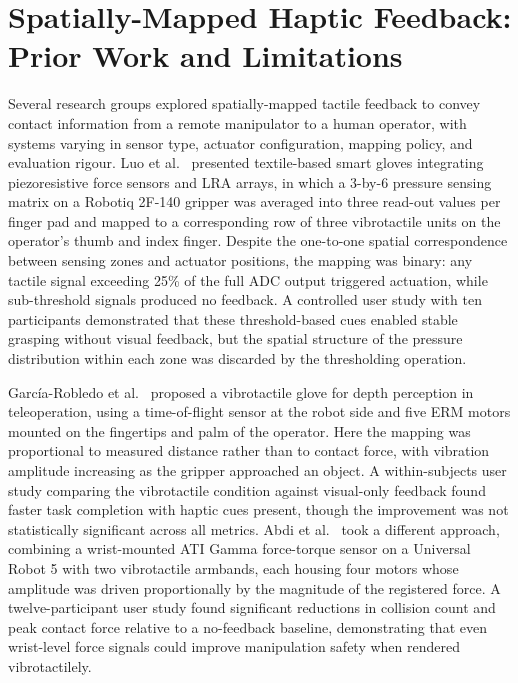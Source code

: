 \documentclass[12pt, a4paper]{report}
\begin{document}
\section{Spatially-Mapped Haptic Feedback: Prior Work and Limitations}
Several research groups explored spatially-mapped tactile feedback to convey contact information from a remote manipulator to a human operator, with systems varying in sensor type, actuator configuration, mapping policy, and evaluation rigour. Luo et al.\ \cite{luo2024} presented textile-based smart gloves integrating piezoresistive force sensors and LRA arrays, in which a 3-by-6 pressure sensing matrix on a Robotiq 2F-140 gripper was averaged into three read-out values per finger pad and mapped to a corresponding row of three vibrotactile units on the operator's thumb and index finger. Despite the one-to-one spatial correspondence between sensing zones and actuator positions, the mapping was binary: any tactile signal exceeding 25\% of the full ADC output triggered actuation, while sub-threshold signals produced no feedback. A controlled user study with ten participants demonstrated that these threshold-based cues enabled stable grasping without visual feedback, but the spatial structure of the pressure distribution within each zone was discarded by the thresholding operation.

García-Robledo et al.\ \cite{garciarobledo2011} proposed a vibrotactile glove for depth perception in teleoperation, using a time-of-flight sensor at the robot side and five ERM motors mounted on the fingertips and palm of the operator. Here the mapping was proportional to measured distance rather than to contact force, with vibration amplitude increasing as the gripper approached an object. A within-subjects user study comparing the vibrotactile condition against visual-only feedback found faster task completion with haptic cues present, though the improvement was not statistically significant across all metrics. Abdi et al.\ \cite{abdi2020} took a different approach, combining a wrist-mounted ATI Gamma force-torque sensor on a Universal Robot 5 with two vibrotactile armbands, each housing four motors whose amplitude was driven proportionally by the magnitude of the registered force. A twelve-participant user study found significant reductions in collision count and peak contact force relative to a no-feedback baseline, demonstrating that even wrist-level force signals could improve manipulation safety when rendered vibrotactilely.
\end{document}
